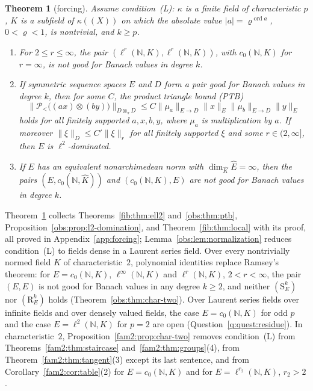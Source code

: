 \documentclass[11pt]{amsart}
\theoremstyle{definition}
\theoremstyle{remark}
\numberwithin{equation}{section}
\newcommand{\N}{\mathbb N}
\newcommand{\linf}{\ell^\infty}
\newcommand{\abs}[1]{\lvert #1\rvert}
\newcommand{\norm}[1]{\lVert #1\rVert}
\newcommand{\ord}{\operatorname{ord}}
\newcommand{\Kh}{\widehat K}
\theoremstyle{plain}
\newtheorem{introtheorem}{Theorem}
\theoremstyle{definition}
\theoremstyle{plain}
\newcommand{\cP}{\mathcal P}
\begin{document}
\begin{introtheorem}[forcing]\label{intro:thm:D}
Assume condition~\textup{(L)}: $\kappa$ is a finite field of characteristic $p$, $K$ is a subfield of $\kappa((X))$ on
which the absolute value $\abs a=\varrho^{\ord a}$, $0<\varrho<1$, is nontrivial, and $k\ge p$.
\begin{enumerate}
\item For $2\le r\le\infty$, the pair $(\ell^r(\N,K),\ell^r(\N,K))$, with $c_0(\N,K)$ for $r=\infty$, is not good for
Banach values in degree $k$.
\item If symmetric sequence spaces $E$ and $D$ form a pair good for Banach values in degree $k$, then for some $C$, the
\emph{product triangle bound} \textup{(PTB)}
\[
 \norm{\cP_<\bigl((ax)\otimes(by)\bigr)}_{D\otimes_\pi D}
 \le C\norm{\mu_a}_{E\to D}\norm x_E\norm{\mu_b}_{E\to D}\norm y_E
\]
holds for all finitely supported $a,x,b,y$, where $\mu_a$ is multiplication by $a$. If moreover
$\norm\xi_D\le C'\norm\xi_r$ for all finitely supported $\xi$ and some $r\in(2,\infty]$, then $E$ is $\ell^2$-dominated.
\item If $E$ has an equivalent nonarchimedean norm with $\dim_{\Kh}\widehat E=\infty$, then the pairs
$(E,c_0(\N,\Kh))$ and $(c_0(\N,K),E)$ are not good for Banach values in degree $k$.
\end{enumerate}
\end{introtheorem}

Theorem~\ref{intro:thm:D} collects Theorems~\ref{fib:thm:ell2} and~\ref{obs:thm:ptb},
Proposition~\ref{obs:prop:l2-domination}, and Theorem~\ref{fib:thm:local} with its proof, all proved in
Appendix~\ref{app:forcing}; Lemma~\ref{obs:lem:normalization} reduces condition~\textup{(L)} to fields dense in a
Laurent series field. Over every nontrivially normed field $K$ of characteristic~$2$, polynomial identities replace
Ramsey's theorem: for $E=c_0(\N,K)$, $\linf(\N,K)$ and $\ell^r(\N,K)$, $2<r<\infty$, the pair $(E,E)$ is not good for
Banach values in any degree $k\ge2$, and neither $(\mathrm S^k_E)$ nor $(\mathrm R^k_E)$ holds
(Theorem~\ref{obs:thm:char-two}). Over Laurent series fields over infinite fields and over densely valued fields, the
case $E=c_0(\N,K)$ for odd $p$ and the case $E=\ell^2(\N,K)$ for $p=2$ are open (Question~\ref{q:quest:residue}). In
characteristic~$2$, Proposition~\ref{fam2:prop:char-two} removes condition~\textup{(L)} from
Theorems~\ref{fam2:thm:staircase} and~\ref{fam2:thm:groups}(4), from Theorem~\ref{fam2:thm:tangent}(3) except its last
sentence, and from Corollary~\ref{fam2:cor:table}(2) for $E=c_0(\N,K)$ and for $E=\ell^{r_2}(\N,K)$, $r_2>2$.
\end{document}
